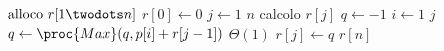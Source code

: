 \begin{codebox}
\li $\text{alloco } r[1 \twodots n]$
\li $r[0] \gets 0$
\li \For $j \gets 1$ \To $n$ \Comment calcolo $r[j]$
\li \Do $q \gets -1$
\li     \For $i \gets 1$ \To $j$
\li     \Do $q \gets \proc{Max}(q, p[i] + r[j-1])$ \Comment $\Theta(1)$
        \End
        $r[j] \gets q$
    \End
\li \Return $r[n]$
\end{codebox}